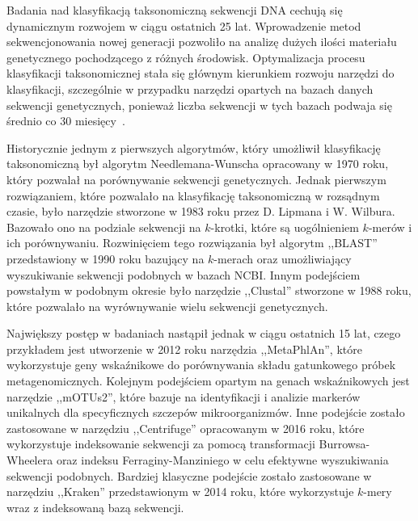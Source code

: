 \documentclass{article}
\newcommand{\temporary}[1]{
    \begin{tcolorbox}[colframe=red, colback=white, title={\textbf{WERSJA PO POLSKU}}, sharp corners=south]
        #1
    \end{tcolorbox}
}
\begin{document}
            \temporary{
                Badania nad klasyfikacją taksonomiczną sekwencji DNA cechują się dynamicznym rozwojem w ciągu ostatnich 25 lat. Wprowadzenie metod sekwencjonowania nowej generacji pozwoliło na analizę dużych ilości materiału genetycznego pochodzącego z różnych środowisk. Optymalizacja procesu klasyfikacji taksonomicznej stała się głównym kierunkiem rozwoju narzędzi do klasyfikacji, szczególnie w przypadku narzędzi opartych na bazach danych sekwencji genetycznych, ponieważ liczba sekwencji w tych bazach podwaja się średnio co 30 miesięcy~\cite{Benson:2008}.

        Historycznie jednym z pierwszych algorytmów, który umożliwił klasyfikację taksonomiczną był algorytm Needlemana-Wunscha\cite{Needleman:1970} opracowany w 1970 roku, który pozwalał na porównywanie sekwencji genetycznych. Jednak pierwszym rozwiązaniem, które pozwalało na klasyfikację taksonomiczną w rozsądnym czasie, było narzędzie stworzone w 1983 roku przez D. Lipmana i W. Wilbura\cite{Wilbur:1983}. Bazowało ono na podziale sekwencji na $k$-krotki, które są uogólnieniem $k$-merów i ich porównywaniu. Rozwinięciem tego rozwiązania był algorytm ,,BLAST'' przedstawiony w 1990 roku\cite{Altschul:1990} bazujący na $k$-merach oraz umożliwiający wyszukiwanie sekwencji podobnych w bazach NCBI. Innym podejściem powstałym w podobnym okresie było narzędzie ,,Clustal''\cite{Higgins:1988} stworzone w 1988 roku, które pozwalało na wyrównywanie wielu sekwencji genetycznych.

        Największy postęp w badaniach nastąpił jednak w ciągu ostatnich 15 lat, czego przykładem jest utworzenie w 2012 roku narzędzia ,,MetaPhlAn''\cite{Segata:2012}, które wykorzystuje geny wskaźnikowe do porównywania składu gatunkowego próbek metagenomicznych. Kolejnym podejściem opartym na genach wskaźnikowych jest narzędzie ,,mOTUs2''\cite{Milanese:2019}, które bazuje na identyfikacji i analizie markerów unikalnych dla specyficznych szczepów mikroorganizmów. Inne podejście zostało zastosowane w narzędziu ,,Centrifuge''\cite{Kim:2016} opracowanym w 2016 roku, które wykorzystuje indeksowanie sekwencji za pomocą transformacji Burrowsa-Wheelera\cite{Burrows:1994} oraz indeksu Ferraginy-Manziniego\cite{Ferragina:2000} w celu efektywne wyszukiwania sekwencji podobnych. Bardziej klasyczne podejście zostało zastosowane w narzędziu ,,Kraken''\cite{Wood:2014} przedstawionym w 2014 roku, które wykorzystuje $k$-mery wraz z indeksowaną bazą sekwencji.

}
\end{document}
